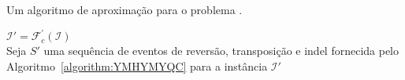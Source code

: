 \begin{algorithm}[!tbh]
  \caption{Um algoritmo de aproximação para o problema \SbFIRTI{}.\label{algorithm:WWDUHPBG}}
  $\mathcal{I}' = \mathcal{F}_{c}^{'}(\mathcal{I})$ \\
  Seja $S'$ uma sequência de eventos de reversão, transposição e indel fornecida pelo Algoritmo~\ref{algorithm:YMHYMYQC} para a instância $\mathcal{I}'$ \\
\end{algorithm}